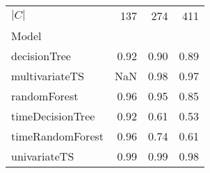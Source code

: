 \begin{tabular}{lrrr}
\toprule
$|C|$ & 137 & 274 & 411 \\
Model &  &  &  \\
\midrule
decisionTree & 0.92 & 0.90 & 0.89 \\
multivariateTS & NaN & 0.98 & 0.97 \\
randomForest & 0.96 & 0.95 & 0.85 \\
timeDecisionTree & 0.92 & 0.61 & 0.53 \\
timeRandomForest & 0.96 & 0.74 & 0.61 \\
univariateTS & 0.99 & 0.99 & 0.98 \\
\bottomrule
\end{tabular}
